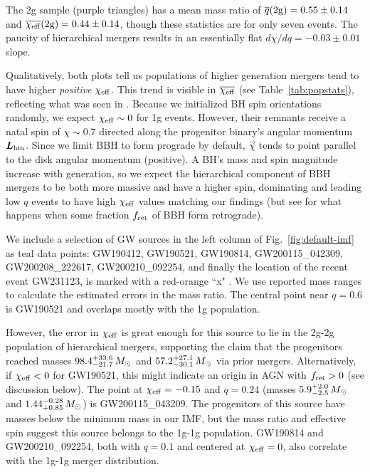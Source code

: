 The 2g sample (purple triangles) has a mean mass ratio of $\barq({\rm 2g})=0.55\pm0.14$ and $\barXeff({\rm 2g})=0.44\pm0.14$, though these statistics are for only seven events.
The paucity of hierarchical mergers results in an essentially flat $d\chi/dq=-0.03\pm0.01$ slope.

Qualitatively, both plots tell us populations of higher generation mergers tend to have higher \textit{positive} $\Xeff$.
This trend is visible in $\overline{\Xeff}$ (see Table~\ref{tab:popstats}), reflecting what was seen in \citet{McKernan+22:q-Xeff}.
Because we initialized BH spin orientations randomly, we expect $\Xeff\sim0$ for 1g events.
However, their remnants receive a natal spin of $\chi \sim 0.7$ directed along the progenitor binary's angular momentum $\vec{L}_{\rm bin}$.
Since we limit BBH to form prograde by default, $\vec{\chi}$ tends to point parallel to the disk angular momentum (positive).
A BH's mass and spin magnitude increase with generation, so we expect the hierarchical component of BBH mergers to be both more massive and have a higher spin, dominating  and leading low $q$ events to have high $\Xeff$ values matching our findings (but see  for what happens when some fraction $\fret$ of BBH form retrograde).

We include a selection of GW sources in the left column of Fig.~\ref{fig:default-imf} as teal data points: GW190412, GW190521, GW190814, GW200115\_042309, GW200208\_222617, GW200210\_092254, 
and finally the location of the recent event  GW231123, is marked with a red-orange ``x"
\citep{Abbott+20-GW190521astro,Abbott+20-GW190521,Abbott+23-O3b,Abbott+24:GWTC-2.1,LVK+25-GW231123}.
We use reported mass ranges to calculate the estimated errors in the mass ratio.
The central point near $q=0.6$ is GW190521 and overlaps mostly with the 1g population.

However, the error in $\Xeff$ is great enough for this source to lie in the 2g-2g population of hierarchical mergers, supporting the claim that the progenitors reached masses $98.4_{-21.7}^{+33.6}\,\Msun$ and $57.2_{-30.1}^{+27.1}\,\Msun$ via prior mergers.
Alternatively, if $\Xeff<0$ for GW190521, this might indicate an origin in AGN with $f_{\rm ret}>0$ (see discussion below).
The point at $\Xeff=-0.15$ and $q=0.24$ (masses $5.9_{-2.5}^{+2.0}\,\Msun$ and $1.44_{+0.85}^{-0.28}\,\Msun$) is GW200115\_043209.
The progenitors of this source have masses below the minimum mass in our IMF, but the mass ratio and effective spin suggest this source belongs to the 1g-1g population.
GW190814 and GW200210\_092254, both with $q=0.1$ and centered at $\Xeff=0$, also correlate with the 1g-1g merger distribution.

